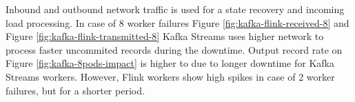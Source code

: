 Inbound and outbound network traffic is used for a state recovery and
incoming load processing.
In case of 8 worker failures Figure \ref{fig:kafka-flink-received-8} and Figure \ref{fig:kafka-flink-transmitted-8}
Kafka Streams uses higher network to process faster uncommited records during the downtime.
Output record rate on Figure  \ref{fig:kafka-8pods-impact} is higher to due to longer downtime for
Kafka Streams workers.
However, Flink workers show high spikes in case of 2 worker failures, but for a shorter period.